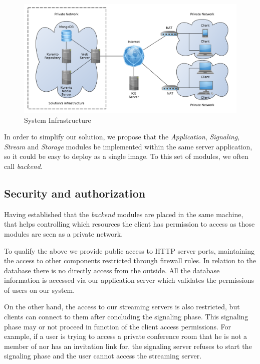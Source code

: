 \begin{figure}[H]
	\centering
	\includegraphics[width=\textwidth]{figures/infrastructure.pdf}
	\caption{System Infrastructure}
\end{figure}

In order to simplify our solution, we propose that the \emph{Application}, \emph{Signaling}, \emph{Stream} and \emph{Storage} modules be implemented within the same server application, so it could be easy to deploy as a single image. To this set of modules, we often call \emph{backend}.

	\subsection{Security and authorization}

Having established that the \emph{backend} modules are placed in the same machine, that helps controlling which resources the client has permission to access as those modules are seen as a private network.

To qualify the above we provide public access to \ac{HTTP} server ports, maintaining the access to other components restricted through firewall rules.
In relation to the database there is no directly access from the outside. All the database information is accessed via our application server which validates the permissions of users on our system.

On the other hand, the access to our streaming servers is also restricted, but clients can connect to them after concluding the signaling phase. This signaling phase may or not proceed in function of the client access permissions. For example, if a user is trying to access a private conference room that he is not a member of nor has an invitation link for, the signaling server refuses to start the signaling phase and the user cannot access the streaming server.

